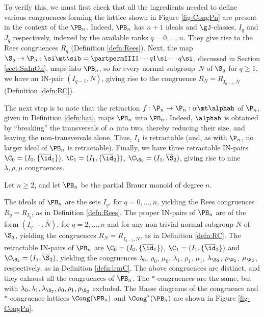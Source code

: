 To verify this, we must first check that all the ingredients needed to define various congruences forming the lattice shown in Figure \ref{fig-CongPn} are present in the context of the $\PB_n$. Indeed, $\PB_n$ has $n+1$ ideals and $\gJ$-classes, $I_q$ and $J_q$ respectively, indexed by the available ranks $q=0,\dots, n$.
They give rise to the Rees congruences $R_q$ (Definition \ref{defn:Rees}).
Next, the map $\S_q\to\P_n:\si\mt\sib=\partpermIII1\cdots q{1\si}\cdots{q\si}$, discussed in Section \ref{sect:SnInOn}, maps into $\PB_n$, so for every normal subgroup~$N$ of $ \S_q$ for $q\geq1$, we have an IN-pair $(I_{q-1},\overline{N})$, giving rise to the congruence $R_N=R_{I_{q-1},\overline N}$ (Definition \ref{defn:RC}).
%


The next step is to note that the retraction $f:\P_n\to\P_n:\alpha\mt\alphah$ of $\P_n$, given in Definition \ref{defn:hat}, maps $\PB_n$ into $\PB_n$.  Indeed, $\alphah$ is obtained by ``breaking'' the transversals of $\alpha$ into two, thereby reducing their size, and leaving the non-transversals alone.  Thus, $I_1$ is retractable (and, as with $\P_n$, no larger ideal of $\PB_n$ is retractable).  Finally, we have three retractable IN-pairs $\C_0=(I_0,\{\overline{\id}_1\})$, $\C_1=(I_1,\{\overline{\id}_2\})$, $\C_{\S_2}=(I_1,\overline{\S}_2)$, giving rise to nine $\lambda,\rho,\mu$ congruences.





\begin{thm}\label{thm-CongPBn}
Let $n\geq2$, and let $\PB_n$ be the partial Brauer monoid of degree $n$.
\begin{itemize}
 The ideals of $\PB_n$ are the sets $I_q$, for $q=0,\ldots,n$, yielding the Rees congruences $R_q=R_{I_q}$, as in Definition \ref{defn:Rees}.
 The proper IN-pairs of $\PB_n$ are of the form $(I_{q-1},\overline N)$, for $q=2,\ldots,n$ and for any non-trivial normal subgroup $N$ of $\S_q$, yielding the congruences $R_N=R_{I_{q-1},\overline N}$, as in Definition \ref{defn:RC}.
 The retractable IN-pairs of $\PB_n$ are $\C_0=(I_0,\{\overline{\id}_1\})$, $\C_1=(I_1,\{\overline{\id}_2\})$ and $\C_{\S_2}=(I_1,\overline{\S}_2)$, yielding the congruences $\lambda_0$, $\rho_0$, $\mu_0$, $\lambda_1$, $\rho_1$, $\mu_1$, $\lambda_{\S_2}$, $\rho_{\S_2}$, $\mu_{\S_2}$, respectively, as in Definition \ref{defn:lrmC}.
 The above congruences are distinct, and they exhaust all the congruences of $\PB_n$.
 The $\ast$-congruences are the same, but with $\lambda_0,\lambda_1,\lambda_{\S_2},\rho_0,\rho_1,\rho_{\S_2}$ excluded.
 The Hasse diagrams of the congruence and $*$-congruence lattices $\Cong(\PB_n)$ and $\Cong^*(\PB_n)$ are shown in Figure \ref{fig-CongPn}.
\end{itemize}
\end{thm}





